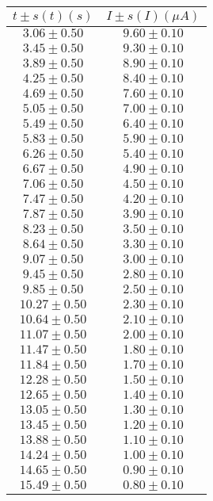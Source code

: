 \begin{table}[H]
\centering
\setlength{\arrayrulewidth}{1.2pt}
\begin{tabular}{|c|c|}
\hline
$t \pm s(t) (s)$ & $I \pm s(I) (\mu A)$ \\
\hline
$3.06 \pm 0.50$ & $9.60 \pm 0.10$ \\
$3.45 \pm 0.50$ & $9.30 \pm 0.10$ \\
$3.89 \pm 0.50$ & $8.90 \pm 0.10$ \\
$4.25 \pm 0.50$ & $8.40 \pm 0.10$ \\
$4.69 \pm 0.50$ & $7.60 \pm 0.10$ \\
$5.05 \pm 0.50$ & $7.00 \pm 0.10$ \\
$5.49 \pm 0.50$ & $6.40 \pm 0.10$ \\
$5.83 \pm 0.50$ & $5.90 \pm 0.10$ \\
$6.26 \pm 0.50$ & $5.40 \pm 0.10$ \\
$6.67 \pm 0.50$ & $4.90 \pm 0.10$ \\
$7.06 \pm 0.50$ & $4.50 \pm 0.10$ \\
$7.47 \pm 0.50$ & $4.20 \pm 0.10$ \\
$7.87 \pm 0.50$ & $3.90 \pm 0.10$ \\
$8.23 \pm 0.50$ & $3.50 \pm 0.10$ \\
$8.64 \pm 0.50$ & $3.30 \pm 0.10$ \\
$9.07 \pm 0.50$ & $3.00 \pm 0.10$ \\
$9.45 \pm 0.50$ & $2.80 \pm 0.10$ \\
$9.85 \pm 0.50$ & $2.50 \pm 0.10$ \\
$10.27 \pm 0.50$ & $2.30 \pm 0.10$ \\
$10.64 \pm 0.50$ & $2.10 \pm 0.10$ \\
$11.07 \pm 0.50$ & $2.00 \pm 0.10$ \\
$11.47 \pm 0.50$ & $1.80 \pm 0.10$ \\
$11.84 \pm 0.50$ & $1.70 \pm 0.10$ \\
$12.28 \pm 0.50$ & $1.50 \pm 0.10$ \\
$12.65 \pm 0.50$ & $1.40 \pm 0.10$ \\
$13.05 \pm 0.50$ & $1.30 \pm 0.10$ \\
$13.45 \pm 0.50$ & $1.20 \pm 0.10$ \\
$13.88 \pm 0.50$ & $1.10 \pm 0.10$ \\
$14.24 \pm 0.50$ & $1.00 \pm 0.10$ \\
$14.65 \pm 0.50$ & $0.90 \pm 0.10$ \\
$15.49 \pm 0.50$ & $0.80 \pm 0.10$ \\

\end{tabular}
\end{table}
